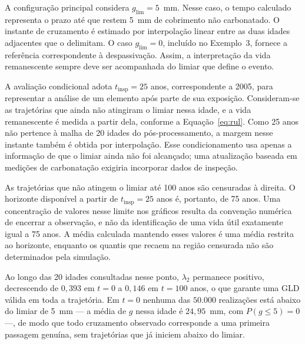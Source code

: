 A configuração principal considera $g_{\mathrm{lim}}=5$~mm. Nesse caso, o tempo calculado representa o prazo até que restem 5~mm de cobrimento não carbonatado. O instante de cruzamento é estimado por interpolação linear entre as duas idades adjacentes que o delimitam. O caso $g_{\mathrm{lim}}=0$, incluído no Exemplo~3, fornece a referência correspondente à despassivação. Assim, a interpretação da vida remanescente sempre deve ser acompanhada do limiar que define o evento.

A avaliação condicional adota $t_{\mathrm{insp}}=25$ anos, correspondente a 2005, para representar a análise de um elemento após parte de sua exposição. Consideram-se as trajetórias que ainda não atingiram o limiar nessa idade, e a vida remanescente é medida a partir dela, conforme a Equação~\eqref{eq:rul}. Como 25 anos não pertence à malha de 20 idades do pós-processamento, a margem nesse instante também é obtida por interpolação. Esse condicionamento usa apenas a informação de que o limiar ainda não foi alcançado; uma atualização baseada em medições de carbonatação exigiria incorporar dados de inspeção.

As trajetórias que não atingem o limiar até 100 anos são censuradas à direita. O horizonte disponível a partir de $t_{\mathrm{insp}}=25$ anos é, portanto, de 75 anos. Uma concentração de valores nesse limite nos gráficos resulta da convenção numérica de encerrar a observação, e não da identificação de uma vida útil exatamente igual a 75 anos. A média calculada mantendo esses valores é uma média restrita ao horizonte, enquanto os quantis que recaem na região censurada não são determinados pela simulação.

Ao longo das 20 idades consultadas nesse ponto, $\lambda_2$ permanece positivo, decrescendo de $0{,}393$ em $t=0$ a $0{,}146$ em $t=100$ anos, o que garante uma GLD válida em toda a trajetória. Em $t=0$ nenhuma das $50.000$ realizações está abaixo do limiar de 5~mm --- a média de $g$ nessa idade é $24{,}95$~mm, com $P(g\leq5)=0$ ---, de modo que todo cruzamento observado corresponde a uma primeira passagem genuína, sem trajetórias que já iniciem abaixo do limiar.


